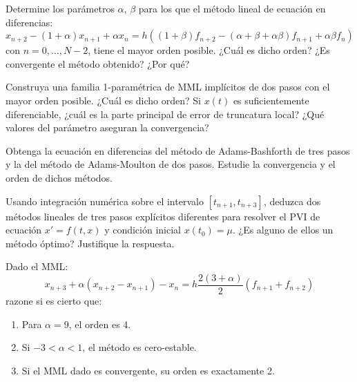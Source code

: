 \begin{ejercicio}\label{ej:3.1.12}
    Determine los parámetros $\alpha$, $\beta$ para los que el método lineal de ecuación en diferencias:
    \begin{equation*}
        x_{n+2} - (1 + \alpha) x_{n+1} + \alpha x_n = h ((1 + \beta) f_{n+2} - (\alpha + \beta + \alpha \beta) f_{n+1} + \alpha \beta f_n)
    \end{equation*}
    con $n = 0, \ldots, N-2$, tiene el mayor orden posible. ¿Cuál es dicho orden? ¿Es convergente el método obtenido? ¿Por qué?
\end{ejercicio}

\begin{ejercicio}\label{ej:3.1.13}
    Construya una familia 1-paramétrica de MML implícitos de dos pasos con el mayor orden posible. ¿Cuál es dicho orden? Si $x(t)$ es suficientemente diferenciable, ¿cuál es la parte principal de error de truncatura local? ¿Qué valores del parámetro aseguran la convergencia?
\end{ejercicio}

\begin{ejercicio}\label{ej:3.1.14}
    Obtenga la ecuación en diferencias del método de Adams-Bashforth de tres pasos y la del método de Adams-Moulton de dos pasos. Estudie la convergencia y el orden de dichos métodos.
\end{ejercicio}

\begin{ejercicio}\label{ej:3.1.15}
    Usando integración numérica sobre el intervalo $[t_{n+1}, t_{n+3}]$, deduzca dos métodos lineales de tres pasos explícitos diferentes para resolver el PVI de ecuación $x' = f(t, x)$ y condición inicial $x(t_0) = \mu$. ¿Es alguno de ellos un método óptimo? Justifique la respuesta.
\end{ejercicio}

\begin{ejercicio}\label{ej:3.1.16}
    Dado el MML:
    \begin{equation*}
        x_{n+3} + \alpha (x_{n+2} - x_{n+1}) - x_n = h \frac{2(3 + \alpha)}{2} (f_{n+1} + f_{n+2})
    \end{equation*}
    razone si es cierto que:
    \begin{enumerate}
        \item Para $\alpha = 9$, el orden es 4.
        \item Si $-3 < \alpha < 1$, el método es cero-estable.
        \item Si el MML dado es convergente, su orden es exactamente 2.
    \end{enumerate}
\end{ejercicio}

